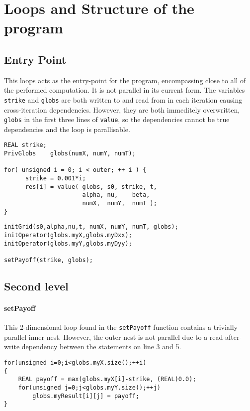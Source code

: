 \section{Loops and Structure of the program}
\subsection{Entry Point}
This loops acts as the entry-point for the program, encompassing close to all of the performed computation. It is not parallel in its
 current form. The variables \verb!strike! and \verb!globs! are both written to and read from in each iteration causing cross-iteration
 dependencies. However, they are both immeditely overwritten, \verb!globs! in the first three lines of \verb!value!, so the dependencies
 cannot be true dependencies and the loop is parallisable.
\begin{lstlisting}[caption=Outermost loop, label=outerloop]
REAL strike;
PrivGlobs    globs(numX, numY, numT);

for( unsigned i = 0; i < outer; ++ i ) {
      strike = 0.001*i;
      res[i] = value( globs, s0, strike, t,
                      alpha, nu,    beta,
                      numX,  numY,  numT );
}
\end{lstlisting}

\begin{lstlisting}[caption=Value function, label=value]
initGrid(s0,alpha,nu,t, numX, numY, numT, globs);
initOperator(globs.myX,globs.myDxx);
initOperator(globs.myY,globs.myDyy);

setPayoff(strike, globs);
\end{lstlisting}


\subsection{Second level}

\paragraph{setPayoff}
This 2-dimensional loop found in the \verb!setPayoff! function contains a trivially parallel inner-nest.
 However, the outer nest is not parallel due to a read-after-write
 dependency between the statements on line 3 and 5.
\begin{lstlisting}[caption=setPayoff() loop, label=payoffloop]
for(unsigned i=0;i<globs.myX.size();++i)
{
	REAL payoff = max(globs.myX[i]-strike, (REAL)0.0);
	for(unsigned j=0;j<globs.myY.size();++j)
		globs.myResult[i][j] = payoff;
}
\end{lstlisting}

